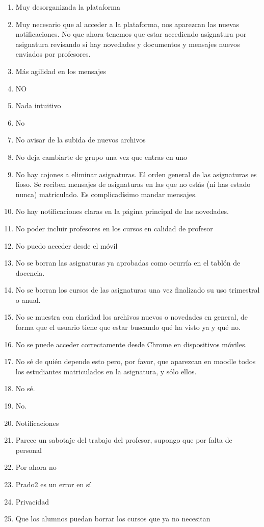 \begin{enumerate}
\item Muy desorganizada la plataforma
\item Muy necesario que al acceder a la plataforma, nos aparezcan las nuevas notificaciones. No que ahora tenemos que estar accediendo asignatura por asignatura revisando si hay novedades y documentos y mensajes nuevos enviados por profesores.
\item Más agilidad en los mensajes
\item NO
\item Nada intuitivo
\item No
\item No avisar de la subida de nuevos archivos
\item No deja cambiarte de grupo una vez que entras en uno
\item No hay cojones a eliminar asignaturas. El orden general de las asignaturas es lioso. Se reciben mensajes de asignaturas en las que no estás (ni has estado nunca) matriculado. Es complicadísimo mandar mensajes.
\item No hay notificaciones claras en la página principal de las novedades.
\item No poder incluir profesores en los cursos en calidad de profesor
\item No puedo acceder desde el móvil
\item No se borran las asignaturas ya aprobadas como ocurría en el tablón de docencia.
\item No se borran los cursos de las asignaturas una vez finalizado su uso trimestral o anual.
\item No se muestra con claridad los archivos nuevos o novedades en general, de forma que el usuario tiene que estar buscando qué ha visto ya y qué no.
\item No se puede acceder correctamente desde Chrome en dispositivos móviles.
\item No sé de quién depende esto pero, por favor, que aparezcan en moodle todos los estudiantes matriculados en la asignatura, y sólo ellos.
\item No sé.
\item No.
\item Notificaciones
\item Parece un sabotaje del trabajo del profesor, supongo que por falta de personal
\item Por ahora no
\item Prado2 es un error en sí
\item Privacidad
\item Que los alumnos puedan borrar los cursos que ya no necesitan

\end{enumerate}

